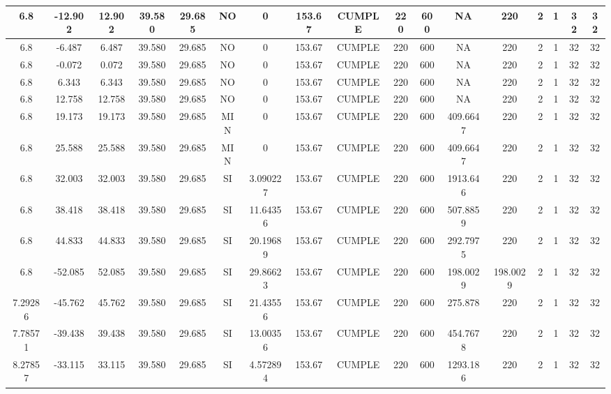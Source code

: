 \begin{table}[H]
{\begin{tabular}{|c|c|c|c|c|c|c|c|c|c|c|c|c|c|c|c|c|}
    \hline
    6.8 & -12.902 & 12.902 & 39.580 & 29.685 & NO  & 0   & 153.67 & CUMPLE & 220 & 600 & NA  & 220 & 2   & 1   & 32  & 32 \bigstrut\\
    \hline
    6.8 & -6.487 & 6.487 & 39.580 & 29.685 & NO  & 0   & 153.67 & CUMPLE & 220 & 600 & NA  & 220 & 2   & 1   & 32  & 32 \bigstrut\\
    \hline
    6.8 & -0.072 & 0.072 & 39.580 & 29.685 & NO  & 0   & 153.67 & CUMPLE & 220 & 600 & NA  & 220 & 2   & 1   & 32  & 32 \bigstrut\\
    \hline
    6.8 & 6.343 & 6.343 & 39.580 & 29.685 & NO  & 0   & 153.67 & CUMPLE & 220 & 600 & NA  & 220 & 2   & 1   & 32  & 32 \bigstrut\\
    \hline
    6.8 & 12.758 & 12.758 & 39.580 & 29.685 & NO  & 0   & 153.67 & CUMPLE & 220 & 600 & NA  & 220 & 2   & 1   & 32  & 32 \bigstrut\\
    \hline
    6.8 & 19.173 & 19.173 & 39.580 & 29.685 & MIN & 0   & 153.67 & CUMPLE & 220 & 600 & 409.6647 & 220 & 2   & 1   & 32  & 32 \bigstrut\\
    \hline
    6.8 & 25.588 & 25.588 & 39.580 & 29.685 & MIN & 0   & 153.67 & CUMPLE & 220 & 600 & 409.6647 & 220 & 2   & 1   & 32  & 32 \bigstrut\\
    \hline
    6.8 & 32.003 & 32.003 & 39.580 & 29.685 & SI  & 3.090227 & 153.67 & CUMPLE & 220 & 600 & 1913.646 & 220 & 2   & 1   & 32  & 32 \bigstrut\\
    \hline
    6.8 & 38.418 & 38.418 & 39.580 & 29.685 & SI  & 11.64356 & 153.67 & CUMPLE & 220 & 600 & 507.8859 & 220 & 2   & 1   & 32  & 32 \bigstrut\\
    \hline
    6.8 & 44.833 & 44.833 & 39.580 & 29.685 & SI  & 20.19689 & 153.67 & CUMPLE & 220 & 600 & 292.7975 & 220 & 2   & 1   & 32  & 32 \bigstrut\\
    \hline
    6.8 & -52.085 & 52.085 & 39.580 & 29.685 & SI  & 29.86623 & 153.67 & CUMPLE & 220 & 600 & 198.0029 & 198.0029 & 2   & 1   & 32  & 32 \bigstrut\\
    \hline
    7.29286 & -45.762 & 45.762 & 39.580 & 29.685 & SI  & 21.43556 & 153.67 & CUMPLE & 220 & 600 & 275.878 & 220 & 2   & 1   & 32  & 32 \bigstrut\\
    \hline
    7.78571 & -39.438 & 39.438 & 39.580 & 29.685 & SI  & 13.00356 & 153.67 & CUMPLE & 220 & 600 & 454.7678 & 220 & 2   & 1   & 32  & 32 \bigstrut\\
    \hline
    8.27857 & -33.115 & 33.115 & 39.580 & 29.685 & SI  & 4.572894 & 153.67 & CUMPLE & 220 & 600 & 1293.186 & 220 & 2   & 1   & 32  & 32 \bigstrut\\

\end{tabular}}
\end{table}
